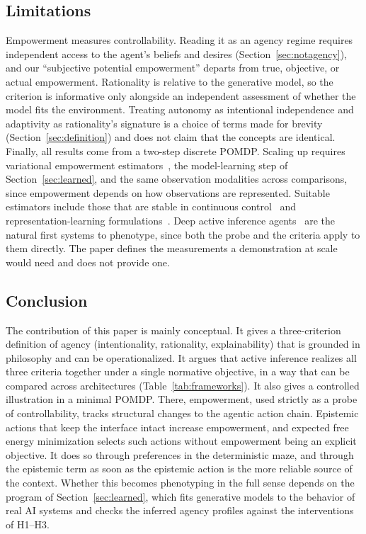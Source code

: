 \documentclass[letterpaper]{article} %
\theoremstyle{definition}
\begin{document}
\subsection{Limitations}
Empowerment measures controllability. Reading it as an agency regime requires independent access to the agent's beliefs and desires (Section~\ref{sec:notagency}), and our ``subjective potential empowerment'' departs from true, objective, or actual empowerment. Rationality is relative to the generative model, so the criterion is informative only alongside an independent assessment of whether the model fits the environment. Treating autonomy as intentional independence and adaptivity as rationality's signature is a choice of terms made for brevity (Section~\ref{sec:definition}) and does not claim that the concepts are identical. Finally, all results come from a two-step discrete POMDP. Scaling up requires variational empowerment estimators~\citep{mohamedVariationalInformationMaximisation2015}, the model-learning step of Section~\ref{sec:learned}, and the same observation modalities across comparisons, since empowerment depends on how observations are represented. Suitable estimators include those that are stable in continuous control~\citep{zhaoEfficientEmpowerment2021} and representation-learning formulations~\citep{choiVariationalEmpowerment2021}. Deep active inference agents~\citep{fountasDeepActiveInference2020} are the natural first systems to phenotype, since both the probe and the criteria apply to them directly. The paper defines the measurements a demonstration at scale would need and does not provide one.

\subsection{Conclusion}

The contribution of this paper is mainly conceptual. It gives a three-criterion definition of agency (intentionality, rationality, explainability) that is grounded in philosophy and can be operationalized. It argues that active inference realizes all three criteria together under a single normative objective, in a way that can be compared across architectures (Table~\ref{tab:frameworks}). It also gives a controlled illustration in a minimal POMDP. There, empowerment, used strictly as a probe of controllability, tracks structural changes to the agentic action chain. Epistemic actions that keep the interface intact increase empowerment, and expected free energy minimization selects such actions without empowerment being an explicit objective. It does so through preferences in the deterministic maze, and through the epistemic term as soon as the epistemic action is the more reliable source of the context. Whether this becomes phenotyping in the full sense depends on the program of Section~\ref{sec:learned}, which fits generative models to the behavior of real AI systems and checks the inferred agency profiles against the interventions of H1--H3.
\end{document}
